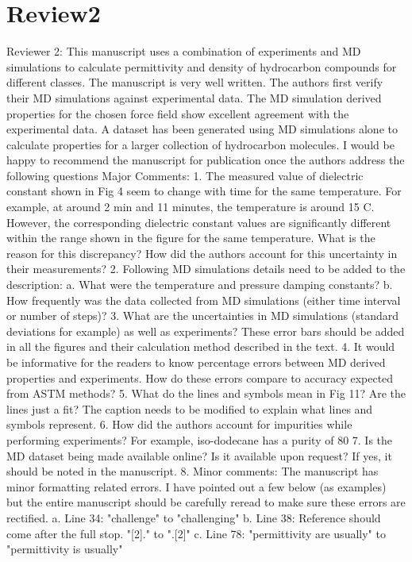 \documentclass{article}
\begin{document}
\section{Review2}
Reviewer 2: This manuscript uses a combination of experiments and MD simulations to calculate permittivity and density of hydrocarbon compounds for different classes. The manuscript is very well written. The authors first verify their MD simulations against experimental data. The MD simulation derived properties for the chosen force field show excellent agreement with the experimental data. A dataset has been generated using MD simulations alone to calculate properties for a larger collection of hydrocarbon molecules. I would be happy to recommend the manuscript for publication once the authors address the following questions
Major Comments:
1.      The measured value of dielectric constant shown in Fig 4 seem to change with time for the same temperature. For example, at around 2 min and 11 minutes, the temperature is around 15 C. However, the corresponding dielectric constant values are significantly different within the range shown in the figure for the same temperature. What is the reason for this discrepancy? How did the authors account for this uncertainty in their measurements? 
2.      Following MD simulations details need to be added to the description:
a.      What were the temperature and pressure damping constants?
b.      How frequently was the data collected from MD simulations (either time interval or number of steps)?
3.      What are the uncertainties in MD simulations (standard deviations for example) as well as experiments? These error bars should be added in all the figures and their calculation method described in the text.
4.      It would be informative for the readers to know percentage errors between MD derived properties and experiments. How do these errors compare to accuracy expected from ASTM methods?
5.      What do the lines and symbols mean in Fig 11? Are the lines just a fit? The caption needs to be modified to explain what lines and symbols represent.
6.      How did the authors account for impurities while performing experiments? For example, iso-dodecane has a purity of 80%
7.      Is the MD dataset being made available online? Is it available upon request? If yes, it should be noted in the manuscript.
8.      Minor comments: The manuscript has minor formatting related errors. I have pointed out a few below (as examples) but the entire manuscript should be carefully reread to make sure these errors are rectified.
a.      Line 34: "challenge" to "challenging"
b.      Line 38: Reference should come after the full stop. "[2]." to ".[2]"
c.      Line 78: "permittivity are usually" to "permittivity is usually"
\end{document}
